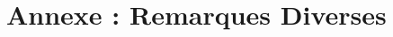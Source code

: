 \setcounter{figure}{0} 
\setcounter{table}{0}
\setcounter{footnote}{0}
\setcounter{equation}{0}
\pagestyle{fancy}
\fancyhf{}
\renewcommand{\chaptermark}[1]{\markboth{\MakeUppercase{#1 }}{}}
\renewcommand{\sectionmark}[1]{\markright{\thesection~ #1}}
\fancyhead[RO]{\bfseries\rightmark}
\fancyhead[LE]{\bfseries\leftmark}
\fancyfoot[RO]{\thepage}
\fancyfoot[LE]{\thepage}
\renewcommand{\headrulewidth}{0.5pt}
\renewcommand{\footrulewidth}{0pt}

\makeatletter
\renewcommand\thefigure{A.\arabic{figure}}
\renewcommand\thetable{A.\arabic{table}} 
\makeatother

\chapter{Annexe : Remarques Diverses}
\graphicspath{{Annexe1/figures/}}


